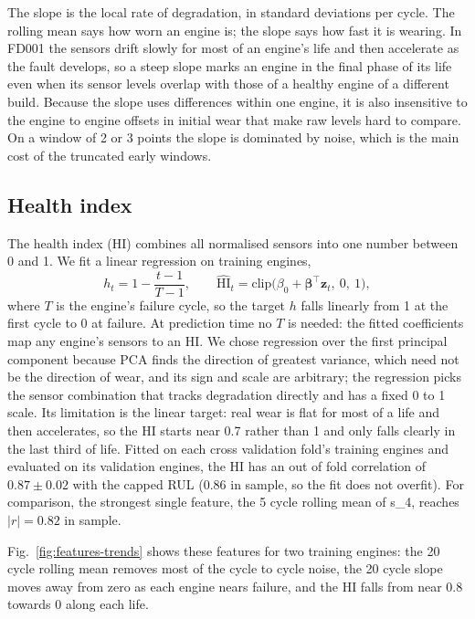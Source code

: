 The slope is the local rate of degradation, in standard deviations per
cycle. The rolling mean says how worn an engine is; the slope says how fast
it is wearing. In FD001 the sensors drift slowly for most of an engine's
life and then accelerate as the fault develops, so a steep slope marks an
engine in the final phase of its life even when its sensor levels overlap
with those of a healthy engine of a different build. Because the slope uses
differences within one engine, it is also insensitive to the engine to
engine offsets in initial wear that make raw levels hard to compare. On a
window of 2 or 3 points the slope is dominated by noise, which is the main
cost of the truncated early windows.

\subsection{Health index}
The health index (HI) combines all normalised sensors into one number
between 0 and 1. We fit a linear regression on training engines,
\begin{equation}
h_t = 1 - \frac{t - 1}{T - 1}, \qquad
\widehat{\mathrm{HI}}_t = \mathrm{clip}\bigl(\beta_0 + \boldsymbol\beta^\top
\mathbf{z}_t,\ 0,\ 1\bigr),
\end{equation}
where $T$ is the engine's failure cycle, so the target $h$ falls linearly
from 1 at the first cycle to 0 at failure. At prediction time no $T$ is
needed: the fitted coefficients map any engine's sensors to an HI. We chose
regression over the first principal component because PCA finds the
direction of greatest variance, which need not be the direction of wear,
and its sign and scale are arbitrary; the regression picks the sensor
combination that tracks degradation directly and has a fixed 0 to 1 scale.
Its limitation is the linear target: real wear is flat for most of a life
and then accelerates, so the HI starts near 0.7 rather than 1 and only
falls clearly in the last third of life. Fitted on each cross validation
fold's training engines and evaluated on its validation engines, the HI has
an out of fold correlation of $0.87 \pm 0.02$ with the capped RUL (0.86 in
sample, so the fit does not overfit). For comparison, the strongest single
feature, the 5 cycle rolling mean of s\_4, reaches $|r| = 0.82$ in sample.

Fig.~\ref{fig:features-trends} shows these features for two training
engines: the 20 cycle rolling mean removes most of the cycle to cycle
noise, the 20 cycle slope moves away from zero as each engine nears
failure, and the HI falls from near 0.8 towards 0 along each life.

